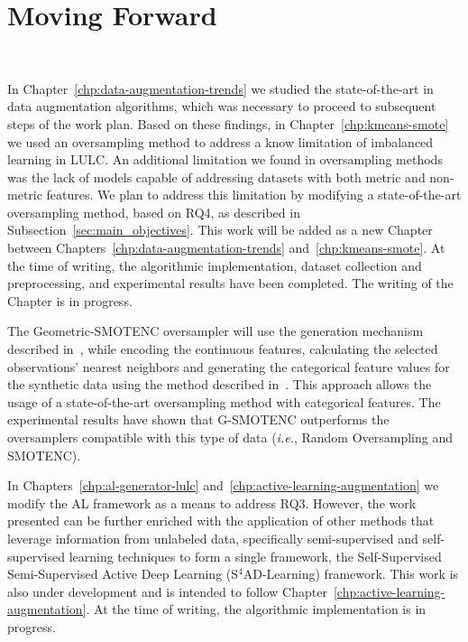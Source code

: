 \chapter{Moving Forward}~\label{chp:moving_forward}
\graphicspath{{figures/moving-forward/}}

In Chapter~\ref{chp:data-augmentation-trends} we studied the state-of-the-art
in data augmentation algorithms, which was necessary to proceed to subsequent
steps of the work plan. Based on these findings, in
Chapter~\ref{chp:kmeans-smote} we used an oversampling method to address a
know limitation of imbalanced learning in LULC\@. An additional limitation we
found in oversampling methods was the lack of models capable of addressing
datasets with both metric and non-metric features. We plan to address this
limitation by modifying a state-of-the-art oversampling method, based on RQ4,
as described in Subsection~\ref{sec:main_objectives}. This work will be added
as a new Chapter between Chapters~\ref{chp:data-augmentation-trends}
and~\ref{chp:kmeans-smote}. At the time of writing, the algorithmic
implementation, dataset collection and preprocessing, and experimental results
have been completed. The writing of the Chapter is in progress.

The Geometric-SMOTENC oversampler will use the generation mechanism described
in~\cite{Douzas2019}, while encoding the continuous features, calculating the
selected observations' nearest neighbors and generating the categorical
feature values for the synthetic data using the method described
in~\cite{Chawla2002}. This approach allows the usage of a state-of-the-art
oversampling method with categorical features. The experimental results have
shown that G-SMOTENC outperforms the oversamplers compatible with this
type of data (\textit{i.e.}, Random Oversampling and SMOTENC).

In Chapters~\ref{chp:al-generator-lulc}
and~\ref{chp:active-learning-augmentation} we modify the AL framework as a
means to address RQ3. However, the work presented can be further enriched with
the application of other methods that leverage information from unlabeled
data, specifically semi-supervised and self-supervised learning techniques to
form a single framework, the Self-Supervised Semi-Supervised Active Deep
Learning (S$^4$AD-Learning) framework.
This work is also under development and is intended to follow
Chapter~\ref{chp:active-learning-augmentation}. At the time of writing, the
algorithmic implementation is in progress.

